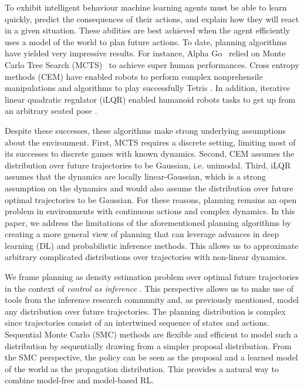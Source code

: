 To exhibit intelligent behaviour machine learning agents must be able to learn quickly, predict the consequences of their actions, and explain how they will react in a given situation. These abilities are best achieved when the agent efficiently uses a model of the world to plan future actions. To date, planning algorithms have yielded very impressive results. For instance, Alpha Go~\citep{silver2017mastering} relied on Monte Carlo Tree Search (MCTS)~\citep{kearns2002sparse} to achieve super human performances. Cross entropy methods (CEM) \citep{rubinstein2004unified} have enabled robots to perform complex nonprehensile manipulations \citep{finn2017deep} and algorithms to play successfully Tetris \citep{szita2006learning}. In addition, iterative linear quadratic regulator (iLQR) \citep{kalman1960contributions, kalman1964linear, todorov2005generalized} enabled humanoid robots tasks to get up from an arbitrary seated pose \citep{tassa2012synthesis}. 


Despite these successes, these algorithms make strong underlying assumptions about the environment.
First, MCTS requires a discrete setting, limiting most of its successes to discrete games with known dynamics.
Second, CEM assumes the distribution over future trajectories to be Gaussian, i.e. unimodal. Third, iLQR assumes that the dynamics are locally linear-Gaussian, which is a strong assumption on the dynamics and would also assume the distribution over future optimal trajectories to be Gaussian. For these reasons, planning remains an open problem in environments with continuous actions and complex dynamics. In this paper, we address the limitations of the aforementioned planning algorithms by creating a more general view of planning that can leverage advances in deep learning (DL) and probabilistic inference methods. This allows us to approximate arbitrary complicated distributions over trajectories with non-linear dynamics.


We frame planning as density estimation problem over optimal future trajectories in the context of \textit{control as inference} \citep{dayan1997using, toussaint2006probabilistic, toussaint2009robot, rawlik2010approximate, rawlik2012stochastic, ziebart2010modeling, levine2013variational}.  This perspective allows us to make use of tools from the inference research community and, as previously mentioned, model any distribution over future trajectories. The planning distribution is complex since trajectories consist of an intertwined sequence of states and actions. Sequential Monte Carlo (SMC) \citep{stewart1992use, gordon1993novel, kitagawa1996monte} methods are flexible and efficient to model such a distribution by sequentially drawing from a simpler proposal distribution.
From the SMC perspective, the policy can be seen as the proposal and a learned model of the world as the propagation distribution. This provides a natural way to combine model-free and model-based RL.


